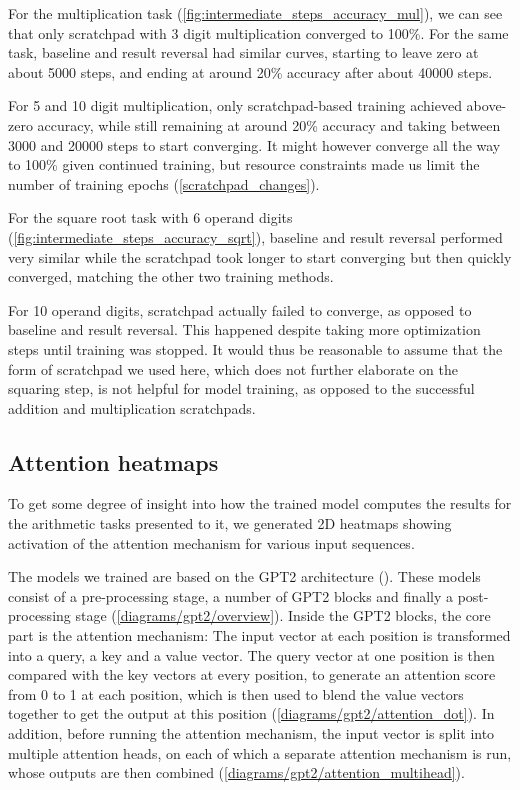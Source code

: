 For the multiplication task (\cref{fig:intermediate_steps_accuracy_mul}), we can see that only scratchpad with 3 digit multiplication converged to 100\%. For the same task, baseline and result reversal had similar curves, starting to leave zero at about 5000 steps, and ending at around 20\% accuracy after about 40000 steps.

For 5 and 10 digit multiplication, only scratchpad-based training achieved above-zero accuracy, while still remaining at around 20\% accuracy and taking between 3000 and 20000 steps to start converging.
It might however converge all the way to 100\% given continued training, but resource constraints made us limit the number of training epochs (\cref{scratchpad_changes}).


For the square root task with 6 operand digits (\cref{fig:intermediate_steps_accuracy_sqrt}), baseline and result reversal performed very similar while the scratchpad took longer to start converging but then quickly converged, matching the other two training methods.

For 10 operand digits, scratchpad actually failed to converge, as opposed to baseline and result reversal. This happened despite taking more optimization steps until training was stopped. It would thus be reasonable to assume that the form of scratchpad we used here, which does not further elaborate on the squaring step, is not helpful for model training, as opposed to the successful addition and multiplication scratchpads.

\subsection{Attention heatmaps}
\label{heatmap}

To get some degree of insight into how the trained model computes the results for the arithmetic tasks presented to it, we generated 2D heatmaps showing activation of the attention mechanism for various input sequences.

The models we trained are based on the GPT2 architecture (\cite{unsupervisedmultitask}). These models consist of a pre-processing stage, a number of GPT2 blocks and finally a post-processing stage (\cref{diagrams/gpt2/overview}). Inside the GPT2 blocks, the core part is the attention mechanism: The input vector at each position is transformed into a query, a key and a value vector. The query vector at one position is then compared with the key vectors at every position, to generate an attention score from 0 to 1 at each position, which is then used to blend the value vectors together to get the output at this position (\cref{diagrams/gpt2/attention_dot}).
In addition, before running the attention mechanism, the input vector is split into multiple attention heads, on each of which a separate attention mechanism is run, whose outputs are then combined (\cref{diagrams/gpt2/attention_multihead}).

